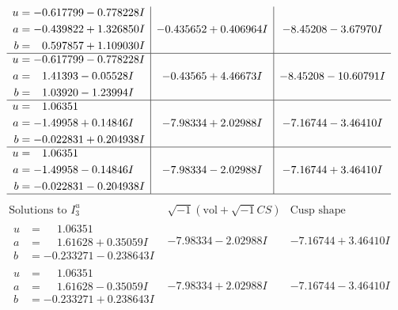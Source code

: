 \documentclass[1p]{elsarticle_modified}
\theoremstyle{definition}
\newcommand{\I}{\sqrt{-1}}
\begin{document}
$$\begin{array}{c|c|c}
\begin{aligned}
u &= -0.617799 - 0.778228 I \\
a &= -0.439822 + 1.326850 I \\
b &= \phantom{-}0.597857 + 1.109030 I\end{aligned}
 & -0.435652 + 0.406964 I & -8.45208 - 3.67970 I \\ \hline\begin{aligned}
u &= -0.617799 - 0.778228 I \\
a &= \phantom{-}1.41393 - 0.05528 I \\
b &= \phantom{-}1.03920 - 1.23994 I\end{aligned}
 & -0.43565 + 4.46673 I & -8.45208 - 10.60791 I \\ \hline\begin{aligned}
u &= \phantom{-}1.06351\phantom{ +0.000000I} \\
a &= -1.49958 + 0.14846 I \\
b &= -0.022831 + 0.204938 I\end{aligned}
 & -7.98334 + 2.02988 I & -7.16744 - 3.46410 I \\ \hline\begin{aligned}
u &= \phantom{-}1.06351\phantom{ +0.000000I} \\
a &= -1.49958 - 0.14846 I \\
b &= -0.022831 - 0.204938 I\end{aligned}
 & -7.98334 - 2.02988 I & -7.16744 + 3.46410 I\\
 \hline 
 \end{array}$$\newpage$$\begin{array}{c|c|c}  
\text{Solutions to }I^u_{3}& \I (\text{vol} + \sqrt{-1}CS) & \text{Cusp shape}\\
 \hline 
\begin{aligned}
u &= \phantom{-}1.06351\phantom{ +0.000000I} \\
a &= \phantom{-}1.61628 + 0.35059 I \\
b &= -0.233271 - 0.238643 I\end{aligned}
 & -7.98334 - 2.02988 I & -7.16744 + 3.46410 I \\ \hline\begin{aligned}
u &= \phantom{-}1.06351\phantom{ +0.000000I} \\
a &= \phantom{-}1.61628 - 0.35059 I \\
b &= -0.233271 + 0.238643 I\end{aligned}
 & -7.98334 + 2.02988 I & -7.16744 - 3.46410 I \\ \hline\begin{aligned}

\end{aligned}
\end{array}$$
\end{document}
